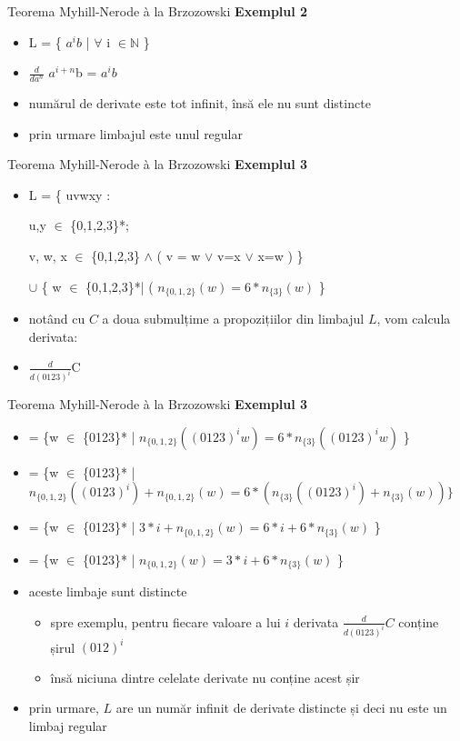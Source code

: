 \documentclass[pdf]{beamer}
\begin{document}
\begin{frame}{Teorema Myhill-Nerode à la Brzozowski}
\textbf{Exemplul 2}
\begin{itemize}
\item
L = \{ $a^{i} b$ | $\forall$ i $\in \mathbb{N}$ \}
\item
$\frac{d}{da^{n}}$ $a^{i+n}$b = $a^{i}b $ 
\item
numărul de derivate este tot infinit, însă ele nu sunt distincte
\item
prin urmare limbajul este unul regular
\end{itemize}
\end{frame}



\begin{frame}{Teorema Myhill-Nerode à la Brzozowski}
\textbf{Exemplul 3}
\begin{itemize}
\item
L = \{ uvwxy : 

u,y $\in$ \{0,1,2,3\}*; 

v, w, x $\in$ \{0,1,2,3\} $\wedge$ ( v = w $\vee$ v=x $\vee$ x=w ) \} 

$\cup$ \{ w $\in$ \{0,1,2,3\}*| ( $n_{\{0,1,2\}}(w) = 6*n_{\{3\}} (w)$ \}
\item
notând cu $C$ a doua submulțime a propozițiilor din limbajul $L$, vom calcula derivata:
\item
$\frac{d}{d(0123)^{i}}$C 
\end{itemize}
\end{frame}



\begin{frame}{Teorema Myhill-Nerode à la Brzozowski}
\textbf{Exemplul 3}
\begin{itemize}
\item
= \{w $\in$ \{0123\}* | $n_{\{0,1,2\}}((0123)^{i}w) = 6*n_{\{3\}}((0123)^iw)$ \} 
\item
= \{w $\in$ \{0123\}* | $n_{\{0,1,2\}}((0123)^{i}) + n_{\{0,1,2\}}(w) = 6*(n_{\{3\}}((0123)^{i}) +  n_{\{3\}}(w)) \}$ 
\item
= \{w $\in$ \{0123\}* | $3*i + n_{\{0,1,2\}}(w) = 6*i + 6*n_{\{3\}}(w)$ \}
\item
= \{w $\in$ \{0123\}* | $n_{\{0,1,2\}}(w)  = 3*i + 6*n_{\{3\}}(w)$ \}
\item
aceste limbaje sunt distincte
\begin{itemize}
\item
spre exemplu, pentru fiecare valoare a lui $i$ derivata $\frac{d}{d(0123)^{i}}C$ conține șirul $(012)^i$
\item
însă niciuna dintre celelate derivate nu conține acest șir
\end{itemize}
\item
prin urmare, $L$ are un număr infinit de derivate distincte și deci nu este un limbaj regular
\end{itemize}
\end{frame}
\end{document}
